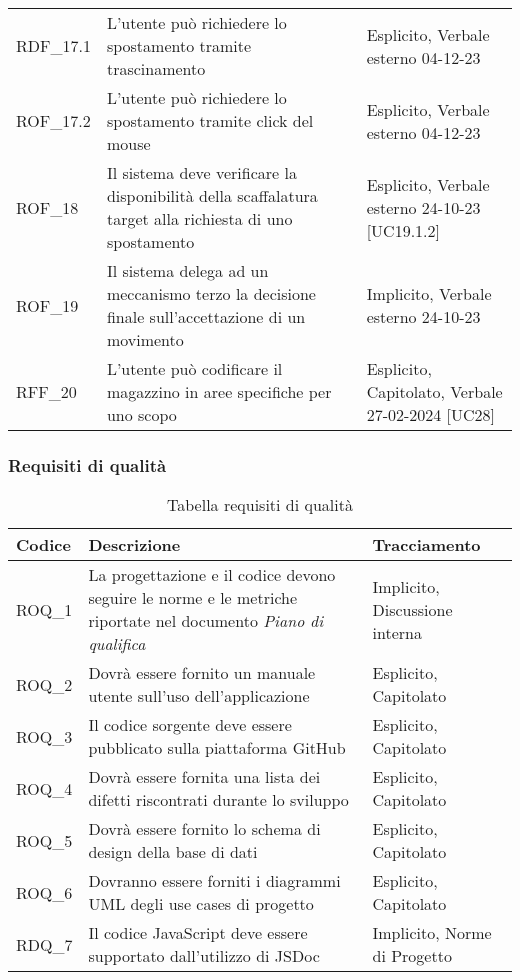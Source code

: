 \begin{xltabular}{\textwidth}{ p{0.1\textwidth} | X | p{0.3\textwidth} }
    RDF\_17.1 & L'utente può richiedere lo spostamento tramite trascinamento & Esplicito, Verbale esterno 04-12-23\\
    ROF\_17.2 & L'utente può richiedere lo spostamento tramite click del mouse & Esplicito, Verbale esterno 04-12-23\\
    ROF\_18 & Il sistema deve verificare la disponibilità della scaffalatura target alla richiesta di uno spostamento & Esplicito, Verbale esterno 24-10-23 [UC19.1.2]\\
    ROF\_19 & Il sistema delega ad un meccanismo terzo la decisione finale sull'accettazione di un movimento & Implicito, Verbale esterno 24-10-23\\
    RFF\_20 & L'utente può codificare il magazzino in aree specifiche per uno scopo & Esplicito, Capitolato, Verbale 27-02-2024 [UC28]\\
    \hline
\end{xltabular}


\subsubsection{Requisiti di qualità}\label{subsec:requisiti_qualita}
\begin{xltabular}{\textwidth}{ p{0.1\textwidth} | X | p{0.3\textwidth} }
    \textbf{\color{white} Codice} & \textbf{\color{white} Descrizione} & \textbf{\color{white} Tracciamento} \\ 
    \endhead

    \caption{Tabella requisiti di qualità}
    \endlastfoot

    ROQ\_1 & La progettazione e il codice devono seguire le norme e le metriche riportate nel documento \textit{Piano di qualifica} & Implicito, Discussione interna \\
    ROQ\_2 & Dovrà essere fornito un manuale utente sull'uso dell'applicazione & Esplicito, Capitolato \\
    ROQ\_3 & Il codice sorgente deve essere pubblicato sulla piattaforma GitHub & Esplicito, Capitolato \\
    ROQ\_4 & Dovrà essere fornita una lista dei difetti riscontrati durante lo sviluppo & Esplicito, Capitolato \\ 
    ROQ\_5 & Dovrà essere fornito lo schema di design della base di dati & Esplicito, Capitolato \\ 
    ROQ\_6 & Dovranno essere forniti i diagrammi UML degli use cases di progetto & Esplicito, Capitolato \\ 
    RDQ\_7 & Il codice JavaScript deve essere supportato dall'utilizzo di JSDoc & Implicito, Norme di Progetto \\
    \hline
\end{xltabular}


